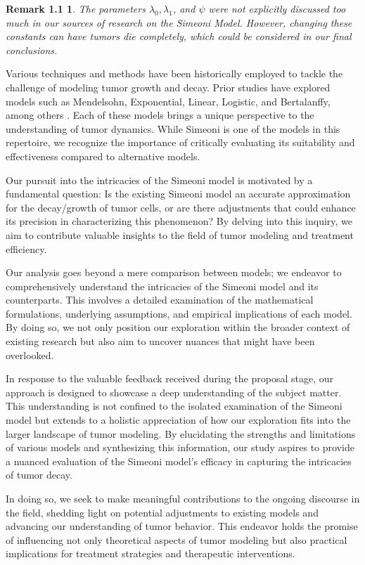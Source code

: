 \documentclass[11pt]{amsart}
\newtheorem*{remark}{Remark 1.1}
\begin{document}
\begin{remark}
    The parameters $\lambda_0, \lambda_1$, and $\psi$ were not explicitly discussed too much in our sources of research on the Simeoni Model. However, changing these constants can have tumors die completely, which could be considered in our final conclusions.
\end{remark}


Various techniques and methods have been historically employed to tackle the challenge of modeling tumor growth and decay. Prior studies have explored models such as Mendelsohn, Exponential, Linear, Logistic, and Bertalanffy, among others \cite{Murphy_Hope_2016}. Each of these models brings a unique perspective to the understanding of tumor dynamics. While Simeoni is one of the models in this repertoire, we recognize the importance of critically evaluating its suitability and effectiveness compared to alternative models.

Our pursuit into the intricacies of the Simeoni model is motivated by a fundamental question: Is the existing Simeoni model an accurate approximation for the decay/growth of tumor cells, or are there adjustments that could enhance its precision in characterizing this phenomenon? By delving into this inquiry, we aim to contribute valuable insights to the field of tumor modeling and treatment efficiency.

Our analysis goes beyond a mere comparison between models; we endeavor to comprehensively understand the intricacies of the Simeoni model and its counterparts. This involves a detailed examination of the mathematical formulations, underlying assumptions, and empirical implications of each model. By doing so, we not only position our exploration within the broader context of existing research but also aim to uncover nuances that might have been overlooked.

In response to the valuable feedback received during the proposal stage, our approach is designed to showcase a deep understanding of the subject matter. This understanding is not confined to the isolated examination of the Simeoni model but extends to a holistic appreciation of how our exploration fits into the larger landscape of tumor modeling. By elucidating the strengths and limitations of various models and synthesizing this information, our study aspires to provide a nuanced evaluation of the Simeoni model's efficacy in capturing the intricacies of tumor decay.

In doing so, we seek to make meaningful contributions to the ongoing discourse in the field, shedding light on potential adjustments to existing models and advancing our understanding of tumor behavior. This endeavor holds the promise of influencing not only theoretical aspects of tumor modeling but also practical implications for treatment strategies and therapeutic interventions.
\end{document}
